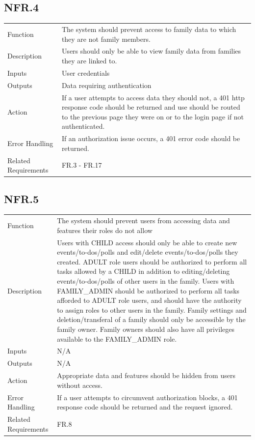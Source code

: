 \documentclass[12pt]{article}
\begin{document}
    \subsection*{NFR.4}
    \begin{center}
        \begin{tabular}{| p{10em} p{26em} |}
        \hline
         Function & The system should prevent access to family data to which they are not family members.\\
         Description & Users should only be able to view family data from families they are linked to.\\
         Inputs & User credentials\\
         Outputs & Data requiring authentication\\
         Action & If a user attempts to access data they should not, a 401 http response code should be returned and use should be routed to the previous page they were on or to the login page if not authenticated.\\
         Error Handling & If an authorization issue occurs, a 401 error code should be returned.\\
         Related Requirements & FR.3 - FR.17\\
         \hline
        \end{tabular}
    \end{center}
    \subsection*{NFR.5}
    \begin{center}
        \begin{tabular}{| p{10em} p{26em} |}
        \hline
         Function & The system should prevent users from accessing data and features their roles do not allow\\
         Description & Users with CHILD access should only be able to create new events/to-dos/polls and edit/delete events/to-dos/polls they created. ADULT role users should be authorized to perform all tasks allowed by a CHILD in addition to editing/deleting events/to-dos/polls of other users in the family. Users with FAMILY\_ADMIN should be authorized to perform all tasks afforded to ADULT role users, and should have the authority to assign roles to other users in the family. Family settings and deletion/transferal of a family should only be accessible by the family owner. Family owners should also have all privileges available to the FAMILY\_ADMIN role.\\
         Inputs & N/A\\
         Outputs & N/A\\
         Action & Appropriate data and features should be hidden from users without access.\\
         Error Handling & If a user attempts to circumvent authorization blocks, a 401 response code should be returned and the request ignored.\\
         Related Requirements & FR.8\\
         \hline
        \end{tabular}
    \end{center}
    
\end{document}
